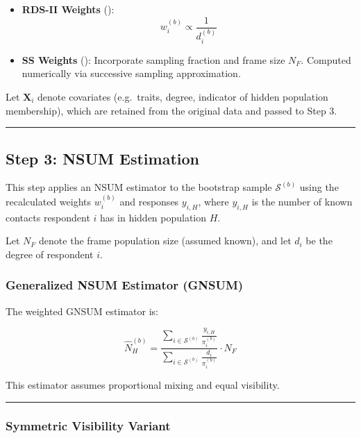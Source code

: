 \documentclass[
  12pt,
  letterpaper,
  DIV=11,
  numbers=noendperiod]{scrartcl}
\theoremstyle{plain}
\theoremstyle{definition}
\begin{document}
\begin{itemize}
\item
  \textbf{RDS-II Weights} (\textcite{volz08-simple}): \[
  w_i^{(b)} \propto \frac{1}{d_i^{(b)}}
  \]
\item
  \textbf{SS Weights} (\textcite{gile11-improv}): Incorporate sampling
  fraction and frame size \(N_F\). Computed numerically via successive
  sampling approximation.
\end{itemize}

Let \(\mathbf{X}_i\) denote covariates (e.g.~traits, degree, indicator
of hidden population membership), which are retained from the original
data and passed to Step 3.

\begin{center}\rule{0.5\linewidth}{0.5pt}\end{center}

\subsection{Step 3: NSUM Estimation}\label{step-3-nsum-estimation}

This step applies an NSUM estimator to the bootstrap sample
\(\mathcal{S}^{(b)}\) using the recalculated weights \(w_i^{(b)}\) and
responses \(y_{i,H}\), where \(y_{i,H}\) is the number of known contacts
respondent \(i\) has in hidden population \(H\).

Let \(N_F\) denote the frame population size (assumed known), and let
\(d_i\) be the degree of respondent \(i\).

\subsubsection{Generalized NSUM Estimator
(GNSUM)}\label{generalized-nsum-estimator-gnsum}

The weighted GNSUM estimator is:

\[
\hat{N}_H^{(b)} = \frac{\sum_{i \in \mathcal{S}^{(b)}} \frac{y_{i,H}}{\pi_i^{(b)}}}{\sum_{i \in \mathcal{S}^{(b)}} \frac{d_i}{\pi_i^{(b)}}} \cdot N_F
\]

This estimator assumes proportional mixing and equal visibility.

\begin{center}\rule{0.5\linewidth}{0.5pt}\end{center}

\subsubsection{Symmetric Visibility
Variant}\label{symmetric-visibility-variant}
\end{document}

